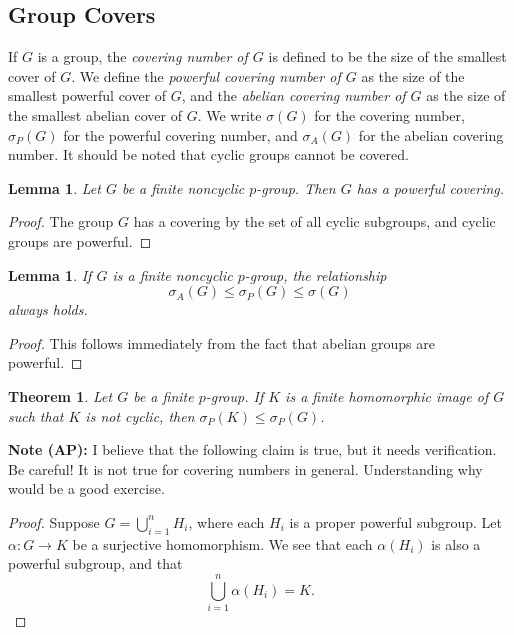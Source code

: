 \documentclass{amsart}
\numberwithin{equation} {section}
\newtheorem{theorem}[equation]{Theorem}
\newtheorem{lemma}[equation]{Lemma}
\theoremstyle{definition}
\begin{document}
\subsection{Group Covers}

If $G$ is a group, the \textit{covering number of $G$} is defined to be the size of the smallest cover of $G$. We define the \textit{powerful covering number of $G$} as the size of the smallest powerful cover of $G$, and the \textit{abelian covering number of $G$} as the size of the smallest abelian cover of $G$. We write $\sigma(G)$ for the covering number, $\sigma_P(G)$ for the powerful covering number, and $\sigma_A(G)$ for the abelian covering number. It should be noted that cyclic groups cannot be covered.

\begin{lemma}\label{l:all-p-groups-have-powerful-covers}
Let $G$ be a finite noncyclic $p$-group. Then $G$ has a powerful covering.
\end{lemma}

\begin{proof}
The group $G$ has a covering by the set of all cyclic subgroups, and cyclic groups are powerful. 
\end{proof}

\begin{lemma}\label{l:powerful-abelian-covering-relationship}
If $G$ is a finite noncyclic $p$-group, the relationship
\[
\sigma_{A}(G) \leq \sigma_{P}(G) \leq \sigma(G)
\]
always holds. 
\end{lemma}

\begin{proof}
This follows immediately from the fact that abelian groups are powerful. 
\end{proof}

\begin{theorem}
Let $G$ be a finite $p$-group. If $K$ is a finite homomorphic image of $G$ such that $K$ is not cyclic, then $\sigma_P(K) \leq \sigma_P(G)$.
\end{theorem}

\textbf{Note (AP):} I believe that the following claim is true, but it needs verification. Be careful! It is not true for covering numbers in general. Understanding why would be a good exercise. 

\begin{proof}
 Suppose $G = \bigcup_{i=1}^n H_i$, where each $H_i$ is a proper powerful subgroup. Let $\alpha: G \rightarrow K$ be a surjective homomorphism. We see that each $\alpha(H_i)$ is also a powerful subgroup, and that \[
 \bigcup_{i=1}^n \alpha\left(H_i\right) = K.
 \]
\end{proof}
\end{document}
